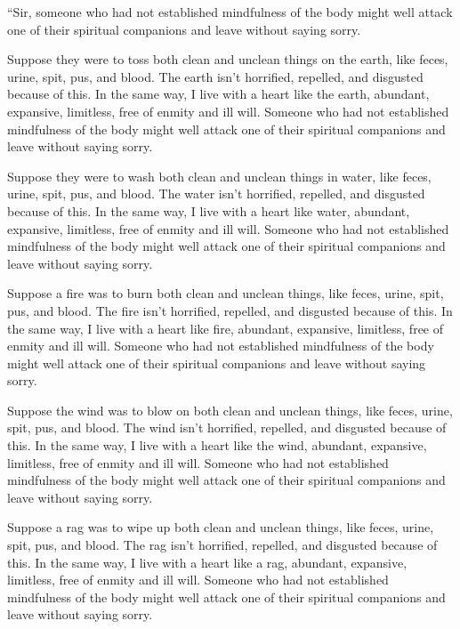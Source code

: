\documentclass[12pt,openany]{book}%
\begin{document}
“Sir, someone who had not established mindfulness of the body might well attack one of their spiritual companions and leave without saying sorry. 

Suppose they were to toss both clean and unclean things on the earth, like feces, urine, spit, pus, and blood. The earth isn’t horrified, repelled, and disgusted because of this. In the same way, I live with a heart like the earth, abundant, expansive, limitless, free of enmity and ill will. Someone who had not established mindfulness of the body might well attack one of their spiritual companions and leave without saying sorry. 

Suppose they were to wash both clean and unclean things in water, like feces, urine, spit, pus, and blood. The water isn’t horrified, repelled, and disgusted because of this. In the same way, I live with a heart like water, abundant, expansive, limitless, free of enmity and ill will. Someone who had not established mindfulness of the body might well attack one of their spiritual companions and leave without saying sorry. 

Suppose a fire was to burn both clean and unclean things, like feces, urine, spit, pus, and blood. The fire isn’t horrified, repelled, and disgusted because of this. In the same way, I live with a heart like fire, abundant, expansive, limitless, free of enmity and ill will. Someone who had not established mindfulness of the body might well attack one of their spiritual companions and leave without saying sorry. 

Suppose the wind was to blow on both clean and unclean things, like feces, urine, spit, pus, and blood. The wind isn’t horrified, repelled, and disgusted because of this. In the same way, I live with a heart like the wind, abundant, expansive, limitless, free of enmity and ill will. Someone who had not established mindfulness of the body might well attack one of their spiritual companions and leave without saying sorry. 

Suppose a rag was to wipe up both clean and unclean things, like feces, urine, spit, pus, and blood. The rag isn’t horrified, repelled, and disgusted because of this. In the same way, I live with a heart like a rag, abundant, expansive, limitless, free of enmity and ill will. Someone who had not established mindfulness of the body might well attack one of their spiritual companions and leave without saying sorry. 
\end{document}

